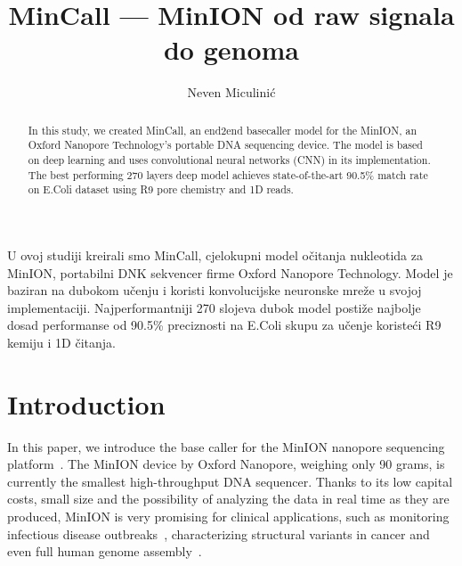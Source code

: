 \documentclass[times, utf8, seminar, numeric]{fer}
\begin{document}
\theoremstyle{definition}
\newtheorem{definition}{Definition}[section]

\title{MinCall --- MinION od raw signala do genoma}
\author{Neven Miculinić}

\maketitle
\tableofcontents

\begin{sazetak}
    U ovoj studiji kreirali smo MinCall, cjelokupni model očitanja nukleotida za MinION, portabilni DNK sekvencer firme Oxford Nanopore Technology. Model je baziran na dubokom učenju i koristi konvolucijske neuronske mreže u svojoj implementaciji. Najperformantniji 270 slojeva dubok model postiže najbolje dosad performanse od 90.5\% preciznosti na E.Coli skupu za učenje koristeći R9 kemiju i 1D čitanja.
    
\end{sazetak}

\begin{abstract}
    In this study, we created MinCall, an end2end basecaller model for the MinION, an  Oxford Nanopore Technology's portable DNA sequencing device. The model is based on deep learning and uses convolutional neural networks (CNN) in its implementation. The best performing 270 layers deep model achieves state-of-the-art 90.5\% match rate on E.Coli dataset using R9 pore chemistry and 1D reads.

\end{abstract}

\chapter{Introduction}

In this paper, we introduce the base caller for the MinION nanopore sequencing platform~\cite{mikheyev2014first}. The MinION device by Oxford Nanopore, weighing only 90 grams, is currently the smallest high-throughput DNA sequencer. Thanks to its low capital costs, small size and the possibility of analyzing the data in real time as they are produced, MinION is very promising for clinical applications, such as monitoring infectious disease outbreaks~\cite{judge2015early}\cite{quick2016real}, characterizing structural variants in cancer\cite{norris2016nanopore} and even full human genome assembly~\cite{jain2017nanopore}.
\end{document}
